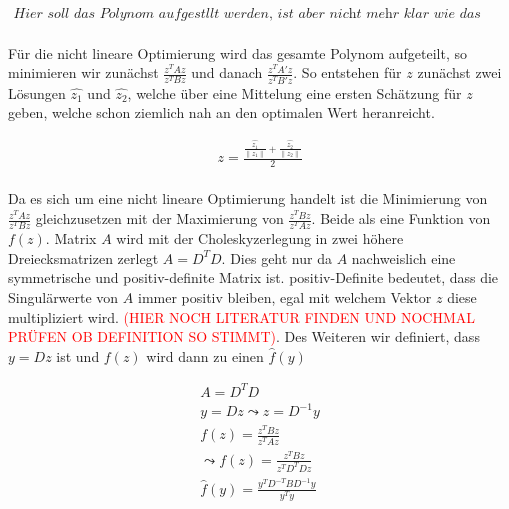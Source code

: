\begin{gather}
\textit{Hier soll das Polynom aufgestllt werden, ist aber nicht mehr klar wie das ging!!!}
\end{gather}\\

Für die nicht lineare Optimierung wird das gesamte Polynom aufgeteilt, so minimieren wir zunächst $\frac{z^TAz}{z^TBz}$ und danach $\frac{z^TA'z}{z^TB'z}$. So entstehen für $z$ zunächst zwei Lösungen 
$\hat{z_1}$ und $\hat{z_2}$, welche über eine Mittelung eine ersten Schätzung für $z$ geben, welche schon ziemlich nah an den optimalen Wert heranreicht.

\begin{gather}
	z = \frac{\frac{\hat{z_1}}{\| z_1 \|}+\frac{\hat{z_2}}{\| z_2 \|}}{2}
\end{gather}\\

Da es sich um eine nicht lineare Optimierung handelt ist die Minimierung von  $\frac{z^TAz}{z^TBz}$ gleichzusetzen mit der Maximierung von  $\frac{z^TBz}{z^TAz}$. Beide als eine Funktion von $f(z)$. Matrix $A$ wird mit der Choleskyzerlegung in zwei höhere Dreiecksmatrizen zerlegt $A = D^TD$\cite{Fortran77}. Dies geht nur da $A$ nachweislich eine symmetrische und positiv-definite Matrix ist.\cite{Fortran77} positiv-Definite bedeutet, dass die Singulärwerte von $A$ immer positiv bleiben, egal mit welchem Vektor $z$ diese multipliziert wird. \textcolor{red}{(HIER NOCH LITERATUR FINDEN UND NOCHMAL PRÜFEN OB DEFINITION SO STIMMT)}.  Des Weiteren wir definiert, dass $y = Dz$ ist und $f(z)$ wird dann zu einen $\hat{f}(y)$

\begin{gather}
	A = D^TD\\
	y= Dz \leadsto z= D^{-1}y\\
	f(z)= \frac{z^TBz}{z^TAz}\\
	\leadsto 
	f(z)=\frac{z^TBz}{z^TD^TDz}\\
	\hat{f}(y)= \frac{y^TD^{-T}BD^{-1}y}{y^Ty}
\end{gather}

